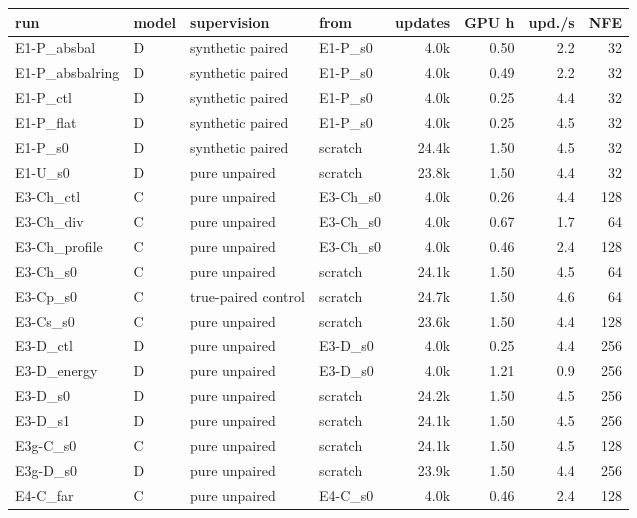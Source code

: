 \scriptsize
\setlength{\tabcolsep}{3pt}
\begin{tabular}{llllrrrr}
\toprule
run & model & supervision & from & updates & GPU h & upd./s & NFE \\
\midrule
E1-P\_absbal & D & synthetic paired & E1-P\_s0 & 4.0k & 0.50 & 2.2 & 32 \\
E1-P\_absbalring & D & synthetic paired & E1-P\_s0 & 4.0k & 0.49 & 2.2 & 32 \\
E1-P\_ctl & D & synthetic paired & E1-P\_s0 & 4.0k & 0.25 & 4.4 & 32 \\
E1-P\_flat & D & synthetic paired & E1-P\_s0 & 4.0k & 0.25 & 4.5 & 32 \\
E1-P\_s0 & D & synthetic paired & scratch & 24.4k & 1.50 & 4.5 & 32 \\
E1-U\_s0 & D & pure unpaired & scratch & 23.8k & 1.50 & 4.4 & 32 \\
E3-Ch\_ctl & C & pure unpaired & E3-Ch\_s0 & 4.0k & 0.26 & 4.4 & 128 \\
E3-Ch\_div & C & pure unpaired & E3-Ch\_s0 & 4.0k & 0.67 & 1.7 & 64 \\
E3-Ch\_profile & C & pure unpaired & E3-Ch\_s0 & 4.0k & 0.46 & 2.4 & 128 \\
E3-Ch\_s0 & C & pure unpaired & scratch & 24.1k & 1.50 & 4.5 & 64 \\
E3-Cp\_s0 & C & true-paired control & scratch & 24.7k & 1.50 & 4.6 & 64 \\
E3-Cs\_s0 & C & pure unpaired & scratch & 23.6k & 1.50 & 4.4 & 128 \\
E3-D\_ctl & D & pure unpaired & E3-D\_s0 & 4.0k & 0.25 & 4.4 & 256 \\
E3-D\_energy & D & pure unpaired & E3-D\_s0 & 4.0k & 1.21 & 0.9 & 256 \\
E3-D\_s0 & D & pure unpaired & scratch & 24.2k & 1.50 & 4.5 & 256 \\
E3-D\_s1 & D & pure unpaired & scratch & 24.1k & 1.50 & 4.5 & 256 \\
E3g-C\_s0 & C & pure unpaired & scratch & 24.1k & 1.50 & 4.5 & 128 \\
E3g-D\_s0 & D & pure unpaired & scratch & 23.9k & 1.50 & 4.4 & 256 \\
E4-C\_far & C & pure unpaired & E4-C\_s0 & 4.0k & 0.46 & 2.4 & 128 \\
\bottomrule
\end{tabular}
